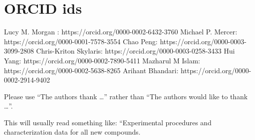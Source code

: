 \documentclass[journal=jacsat,manuscript=article]{achemso}
\begin{document}
\section*{ORCID ids}
Lucy M. Morgan : https://orcid.org/0000-0002-6432-3760 \newline
Michael P. Mercer: https://orcid.org/0000-0001-7578-3554 \newline
Chao Peng: https://orcid.org/0000-0003-3099-2808 \newline
Chris-Kriton Skylaris: https://orcid.org/0000-0003-0258-3433 \newline
Hui Yang: https://orcid.org/0000-0002-7890-5411 \newline
Mazharul M Islam: https://orcid.org/0000-0002-5638-8265 \newline
Arihant Bhandari: https://orcid.org/0000-0002-2914-9402 \newline


\begin{acknowledgement}

Please use ``The authors thank \ldots'' rather than ``The
authors would like to thank \ldots''.


\end{acknowledgement}

\begin{suppinfo}

This will usually read something like: ``Experimental procedures and
characterization data for all new compounds.

\end{suppinfo}


\end{document}
